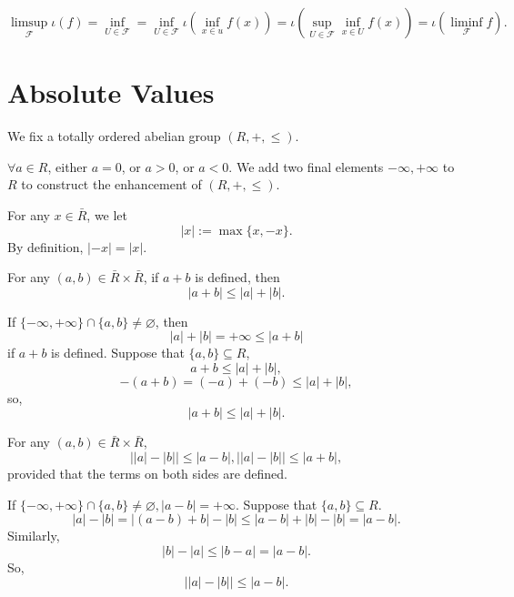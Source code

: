 \begin{proofenv}
    $$\limsup_{\mathcal{F}}\iota(f)=\inf_{U\in \mathcal{F}}=\inf_{U\in \mathcal{F}}\iota\left(\inf_{x\in u}f(x)\right)=\iota\left(\sup_{U\in \mathcal{F}}\inf_{x\in U}f(x)\right)=\iota\left(\liminf_{\mathcal{F}}f\right).$$
\end{proofenv}



\section{Absolute Values}
We fix a totally ordered abelian group $(R,+,\le)$.
\begin{remark}
    $\forall a\in R$, either $a=0$, or $a>0$, or $a<0$. We add two final elements $-\infty,+\infty$ to $R$ to construct the enhancement of $(R,+,\le)$.
\end{remark}
\begin{definitionenv}
    For any $x\in \bar{R}$, we let 
    $$\left|x\right|:=\max\{x,-x\}.$$
    By definition, $\left|-x\right|=\left|x\right|$.
\end{definitionenv}
\begin{propositionenv}
    For any $(a,b)\in \bar{R}\times\bar{R}$, if $a+b$ is defined, then 
    $$\left|a+b\right|\le \left|a\right|+\left| b\right|.$$
\end{propositionenv}
\begin{proofenv}
    If $\{-\infty,+\infty\}\cap\{a,b\}\not=\varnothing$, then 
    $$\left|a\right|+\left|b\right|=+\infty\le\left|a+b\right|$$
    if $a+b$ is defined. Suppose that $\{a,b\}\subseteq R$, 
    $$a+b\le \left|a\right|+\left|b\right|,$$
    $$-\left(a+b\right)=\left(-a\right)+\left(-b\right)\le \left|a\right|+\left|b\right|,$$
    so,
    $$\left|a+b\right|\le \left|a\right|+\left| b\right|.$$
\end{proofenv}
\begin{corollaryenv}
    For any $(a,b)\in \bar{R}\times\bar{R}$,
    $$\left|\left|a\right|-\left|b\right|\right|\le \left|a-b\right|,\left|\left|a\right|-\left|b\right|\right|\le \left|a+b\right|,$$
    provided that the terms on both sides are defined.
\end{corollaryenv}
\begin{proofenv}
    If $\{-\infty,+\infty\}\cap\{a,b\}\not=\varnothing, \left|a-b\right|=+\infty$. Suppose that $\{a,b\}\subseteq R$.
    $$\left|a\right|-\left|b\right|=\left|(a-b)+b\right|-\left|b\right|\le \left|a-b\right|+\left|b\right|-\left|b\right|=\left|a-b\right|.$$
    Similarly, 
    $$\left|b\right|-\left|a\right|\le \left|b-a\right|=\left|a-b\right|.$$
    So,
    $$\left|\left|a\right|-\left|b\right|\right|\le\left|a-b\right|.$$
\end{proofenv}
